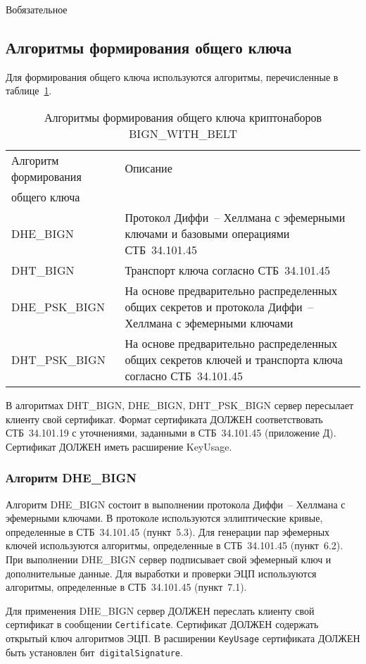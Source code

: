 \begin{appendix}{В}{обязательное}
\subsection{Алгоритмы формирования общего ключа}\label{BSUITES.2.3}

Для формирования общего ключа используются алгоритмы, перечисленные в 
таблице~\ref{Table.BSUITES.2}. 

\begin{table}[!h]
\caption{Алгоритмы формирования общего ключа криптонаборов BIGN\_WITH\_BELT}
\label{Table.BSUITES.2}
\begin{tabular}{|l|p{11.3cm}|}
\hline
Алгоритм формирования & Описание \\
общего ключа &\\
\hline
DHE\_BIGN &  Протокол Диффи~-- Хеллмана с эфемерными ключами и 
базовыми операциями СТБ~34.101.45\\
\hline
DHT\_BIGN &  Транспорт ключа согласно СТБ~34.101.45\\
\hline
DHE\_PSK\_BIGN &  На основе предварительно распределенных общих 
секретов и протокола Диффи~-- Хеллмана с эфемерными ключами\\
\hline
DHT\_PSK\_BIGN &  На основе предварительно распределенных общих 
секретов ключей и транспорта ключа согласно СТБ~34.101.45\\
\hline
\end{tabular}
\end{table}
В алгоритмах DHT\_BIGN, DHE\_BIGN, DHT\_PSK\_BIGN сервер пересылает клиенту 
свой сертификат. Формат сертификата ДОЛЖЕН соответствовать СТБ~34.101.19 
с уточнениями, заданными в СТБ~34.101.45 (приложение Д). Сертификат ДОЛЖЕН 
иметь расширение KeyUsage. 

\subsubsection{Алгоритм DHE\_BIGN}\label{BSUITES.2.3.1}

Алгоритм DHE\_BIGN состоит в выполнении протокола Диффи~-- Хеллмана с 
эфемерными ключами. В протоколе используются эллиптические кривые, 
определенные в СТБ~34.101.45 (пункт~5.3). Для генерации пар эфемерных ключей 
используются алгоритмы, определенные в СТБ~34.101.45 (пункт~6.2). При 
выполнении DHE\_BIGN сервер подписывает свой эфемерный ключ и 
дополнительные данные. Для выработки и проверки ЭЦП используются 
алгоритмы, определенные в СТБ~34.101.45 (пункт~7.1). 

Для применения DHE\_BIGN сервер ДОЛЖЕН переслать клиенту свой сертификат в 
сообщении \lstinline{Certificate}. Сертификат ДОЛЖЕН содержать открытый ключ 
алгоритмов ЭЦП. В расширении \lstinline{KeyUsage} сертификата ДОЛЖЕН быть 
установлен бит~\lstinline{digitalSignature}. 


\end{appendix}
